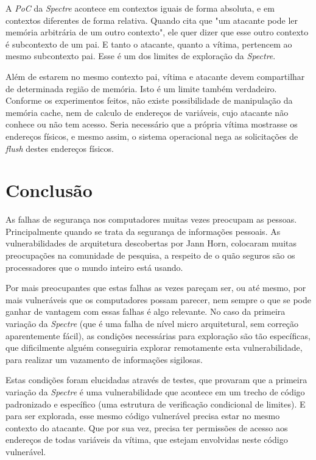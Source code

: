 \documentclass[
	article,			    %
	12pt,				    %
	oneside,			    %
	a4paper,			    %
	chapter=TITLE,		    %
	section=TITLE,		    %
	subsection=TITLE,	    %
	english,			    %
	brazil,				    %
	sumario=tradicional
]{abntex2}
\begin{document}
A \emph{PoC} da \emph{Spectre} acontece em contextos iguais de forma absoluta, e em contextos diferentes de forma relativa. Quando  cita que "um atacante pode ler memória arbitrária de um outro contexto", ele quer dizer que esse outro contexto é subcontexto de um pai. E tanto o atacante, quanto a vítima, pertencem ao mesmo subcontexto pai. Esse é um dos limites de exploração da \emph{Spectre}.

Além de estarem no mesmo contexto pai, vítima e atacante devem compartilhar de determinada região de memória. Isto é um limite também verdadeiro. Conforme os experimentos feitos, não existe possibilidade de manipulação da memória cache, nem de calculo de endereços de variáveis, cujo atacante não conhece ou não tem acesso. Seria necessário que a própria vítima mostrasse os endereços físicos, e mesmo assim, o sistema operacional nega as solicitações de \emph{flush} destes endereços físicos.

\section{Conclusão}
As falhas de segurança nos computadores muitas vezes preocupam as pessoas. Principalmente quando se trata da segurança de informações pessoais. As vulnerabilidades de arquitetura descobertas por Jann Horn, colocaram muitas preocupações na comunidade de pesquisa, a respeito de o quão seguros são os processadores que o mundo inteiro está usando.

Por mais preocupantes que estas falhas as vezes pareçam ser, ou até mesmo, por mais vulneráveis que os computadores possam parecer, nem sempre o que se pode ganhar de vantagem com essas falhas é algo relevante. No caso da primeira variação da \emph{Spectre} (que é uma falha de nível micro arquitetural, sem correção aparentemente fácil), as condições necessárias para exploração são tão específicas, que dificilmente alguém conseguiria explorar remotamente esta vulnerabilidade, para realizar um vazamento de informações sigilosas.

Estas condições foram elucidadas através de testes, que provaram que a primeira variação da \emph{Spectre} é uma vulnerabilidade que acontece em um trecho de código padronizado e específico (uma estrutura de verificação condicional de limites). E para ser explorada, esse mesmo código vulnerável precisa estar no mesmo contexto do atacante. Que por sua vez, precisa ter permissões de acesso aos endereços de todas variáveis da vítima, que estejam envolvidas neste código vulnerável.
\end{document}
